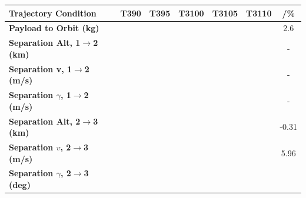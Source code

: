\begin{table}[ht]
\centering
\begin{tabular}{l c c c c c c}
	\hline \textbf{Trajectory Condition}
	&T390
	&T395
	&T3100
	&T3105
	&T3110
	& /\%
	\\
	\hline \textbf{Payload to Orbit (kg)}
	& \PayloadToOrbitTThreeNinetyNoReturn
	& \PayloadToOrbitTThreeNinetyFiveNoReturn
	& \PayloadToOrbitTThreeStandardNoReturn
	& \PayloadToOrbitTThreeOneHundredFiveNoReturn
	& \PayloadToOrbitTThreeOneHundredTenNoReturn
	&2.6
	\\
	\textbf{Separation Alt, 1$\rightarrow$2 (km)}
	& \firstsecondSeparationAltTThreeNinetyNoReturn
	& \firstsecondSeparationAltTThreeNinetyFiveNoReturn
	& \firstsecondSeparationAltTThreeStandardNoReturn
	& \firstsecondSeparationAltTThreeOneHundredFiveNoReturn
	& \firstsecondSeparationAltTThreeOneHundredTenNoReturn
	& -
	\\
	\textbf{Separation v, 1$\rightarrow$2 (m/s)}
	& \firstsecondSeparationvTThreeNinetyNoReturn
	& \firstsecondSeparationvTThreeNinetyFiveNoReturn
	& \firstsecondSeparationvTThreeStandardNoReturn
	& \firstsecondSeparationvTThreeOneHundredFiveNoReturn
	& \firstsecondSeparationvTThreeOneHundredTenNoReturn
	& -
	\\
	\textbf{Separation $\gamma$, 1$\rightarrow$2 (m/s)}
	& \firstsecondSeparationgammaTThreeNinetyNoReturn
	& \firstsecondSeparationgammaTThreeNinetyFiveNoReturn
	& \firstsecondSeparationgammaTThreeStandardNoReturn
	& \firstsecondSeparationgammaTThreeOneHundredFiveNoReturn
	& \firstsecondSeparationgammaTThreeOneHundredTenNoReturn
	& -
	\\
	\textbf{Separation Alt, 2$\rightarrow$3 (km)}
	& \secondthirdSeparationAltTThreeNinetyNoReturn
	& \secondthirdSeparationAltTThreeNinetyFiveNoReturn
	& \secondthirdSeparationAltTThreeStandardNoReturn
	& \secondthirdSeparationAltTThreeOneHundredFiveNoReturn
	& \secondthirdSeparationAltTThreeOneHundredTenNoReturn
	&-0.31
	\\
	\textbf{Separation $v$, 2$\rightarrow$3 (m/s)}
	& \secondthirdSeparationvTThreeNinetyNoReturn
	& \secondthirdSeparationvTThreeNinetyFiveNoReturn
	& \secondthirdSeparationvTThreeStandardNoReturn
	& \secondthirdSeparationvTThreeOneHundredFiveNoReturn
	& \secondthirdSeparationvTThreeOneHundredTenNoReturn
	&5.96
	\\
	\textbf{Separation $\gamma$, 2$\rightarrow$3 (deg)}
	& \secondthirdSeparationgammaTThreeNinetyNoReturn
	& \secondthirdSeparationgammaTThreeNinetyFiveNoReturn
	& \secondthirdSeparationgammaTThreeStandardNoReturn
	& \secondthirdSeparationgammaTThreeOneHundredFiveNoReturn

\end{tabular}
\end{table}
